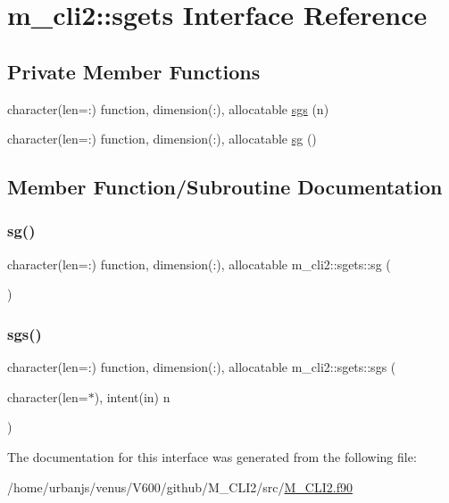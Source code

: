 \hypertarget{interfacem__cli2_1_1sgets}{}\section{m\+\_\+cli2\+:\+:sgets Interface Reference}
\label{interfacem__cli2_1_1sgets}
\subsection*{Private Member Functions}
\begin{DoxyCompactItemize}
\item 
character(len=\+:) function, dimension(\+:), allocatable \mbox{\hyperlink{interfacem__cli2_1_1sgets_a6992270fd209105e956dc3e79a645a52}{sgs}} (n)
\item 
character(len=\+:) function, dimension(\+:), allocatable \mbox{\hyperlink{interfacem__cli2_1_1sgets_aaa1b931d8de18bda6937364ad76f89cb}{sg}} ()
\end{DoxyCompactItemize}


\subsection{Member Function/\+Subroutine Documentation}
\mbox{\label{interfacem__cli2_1_1sgets_aaa1b931d8de18bda6937364ad76f89cb}} 
\subsubsection{\texorpdfstring{sg()}{sg()}}
{\footnotesize\ttfamily character(len=\+:) function, dimension(\+:), allocatable m\+\_\+cli2\+::sgets\+::sg (\begin{DoxyParamCaption}{ }\end{DoxyParamCaption})\hspace{0.3cm}{\ttfamily [private]}}

\mbox{\label{interfacem__cli2_1_1sgets_a6992270fd209105e956dc3e79a645a52}} 
\subsubsection{\texorpdfstring{sgs()}{sgs()}}
{\footnotesize\ttfamily character(len=\+:) function, dimension(\+:), allocatable m\+\_\+cli2\+::sgets\+::sgs (\begin{DoxyParamCaption}\item[{character(len=$\ast$), intent(in)}]{n }\end{DoxyParamCaption})\hspace{0.3cm}{\ttfamily [private]}}



The documentation for this interface was generated from the following file\+:\begin{DoxyCompactItemize}
\item 
/home/urbanjs/venus/\+V600/github/\+M\+\_\+\+C\+L\+I2/src/\mbox{\hyperlink{M__CLI2_8f90}{M\+\_\+\+C\+L\+I2.\+f90}}\end{DoxyCompactItemize}
